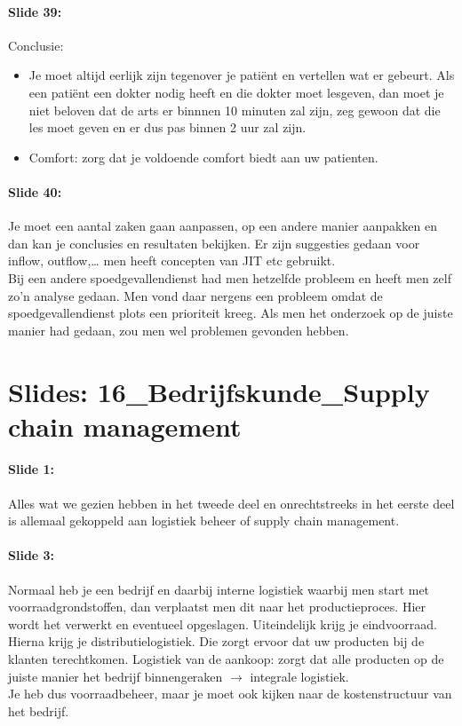\documentclass[10pt,a4paper]{report}
\begin{document}
\paragraph{Slide 39:} Conclusie: 
\begin{itemize}
\item Je moet altijd eerlijk zijn tegenover je pati\"ent en vertellen wat er gebeurt. Als een pati\"ent een dokter nodig heeft en die dokter moet lesgeven, dan moet je niet beloven dat de arts er binnnen 10 minuten zal zijn, zeg gewoon dat die les moet geven en er dus pas binnen 2 uur zal zijn. 
\item Comfort: zorg dat je voldoende comfort biedt aan uw patienten.
\end{itemize}

\paragraph{Slide 40:} Je moet een aantal zaken gaan aanpassen, op een andere manier aanpakken en dan kan je conclusies en resultaten bekijken. Er zijn suggesties gedaan voor inflow, outflow,… men heeft concepten van JIT etc gebruikt.\\
Bij een andere spoedgevallendienst had men hetzelfde probleem en heeft men zelf zo'n analyse gedaan. Men vond daar nergens een probleem omdat de spoedgevallendienst plots een prioriteit kreeg. Als men het onderzoek op de juiste manier had gedaan, zou men wel problemen gevonden hebben.

\section{Slides: 16\_Bedrijfskunde\_Supply chain management}

\paragraph{Slide 1:} Alles wat we gezien hebben in het tweede deel en onrechtstreeks in het eerste deel is allemaal gekoppeld aan logistiek beheer of supply chain management.

\paragraph{Slide 3:} Normaal heb je een bedrijf en daarbij interne logistiek waarbij men start met voorraadgrondstoffen, dan verplaatst men dit naar het productieproces. Hier wordt het verwerkt en eventueel opgeslagen. Uiteindelijk krijg je eindvoorraad. Hierna krijg je distributielogistiek. Die zorgt ervoor dat uw producten bij de klanten terechtkomen. Logistiek van de aankoop: zorgt dat alle producten op de juiste manier het bedrijf binnengeraken $\rightarrow$ integrale logistiek.\\
Je heb dus voorraadbeheer, maar je moet ook kijken naar de kostenstructuur van het bedrijf. 
\end{document}
